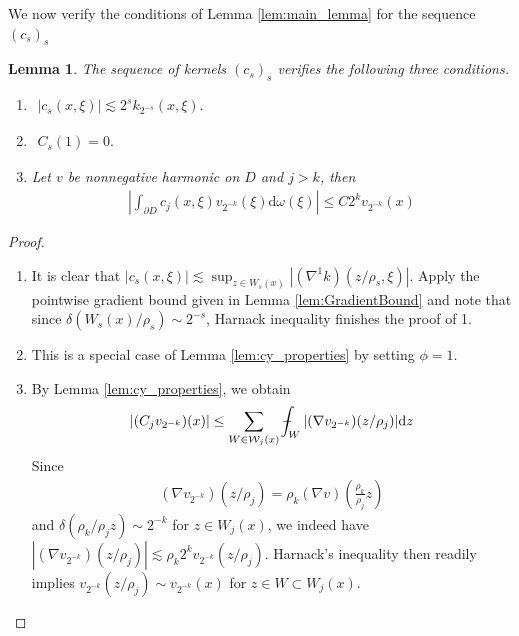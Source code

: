 \documentclass[a4paper,12pt]{article}
\newtheorem{lemma}[theorem]{Lemma}
\theoremstyle{definition}
\theoremstyle{definition}
\def\Xint#1{\mathchoice
	{\XXint\displaystyle\textstyle{#1}}%
	{\XXint\textstyle\scriptstyle{#1}}%
	{\XXint\scriptstyle\scriptscriptstyle{#1}}%
	{\XXint\scriptscriptstyle\scriptscriptstyle{#1}}%
	\!\int}
\def\XXint#1#2#3{{\setbox0=\hbox{$#1{#2#3}{\int}$ }
		\vcenter{\hbox{$#2#3$ }}\kern-.568\wd0}}
\def\dashint{\Xint-}
\begin{document}
	 We now verify the conditions of Lemma \ref{lem:main_lemma} for the sequence $(c_s)_s$
	 \begin{lemma}The sequence of kernels $(c_s)_s$ verifies the following three conditions.
	 	\begin{enumerate}
	 		\item$\begin{aligned}
	 			|c_s(x,\xi)|\lesssim 2^sk_{2^{-s}}(x,\xi).
	 		\end{aligned}$
	 		\item$\begin{aligned}
	 			C_s(1)=0.
	 		\end{aligned}$
	 		\item Let $v$ be nonnegative harmonic on $D$ and $j>k$, then
	 		\begin{align*}
	 			\left|\int_{\partial D}c_j(x,\xi)v_{2^{-k}}(\xi)\mathrm d\omega(\xi)\right| \leq C2^kv_{2^{-k}}(x)
	 		\end{align*}
	 	\end{enumerate}
	 \end{lemma}
	\begin{proof}
	 	\begin{enumerate}
	 		\item It is clear that $|c_s(x,\xi)|\lesssim\sup_{z\in W_s(x)}|(\nabla^1 k)(z/\rho_s,\xi)|$. Apply the pointwise gradient bound given in Lemma \ref{lem:GradientBound} and note that since $\delta(W_s(x)/\rho_s)\sim2^{-s}$, Harnack inequality finishes the proof of 1.
	 		\item This is a special case of Lemma \ref{lem:cy_properties} by setting $\phi=1$.
	 		\item By Lemma \ref{lem:cy_properties}, we obtain
	 		\begin{align*}
	 			\left|(C_jv_{2^{-k}})(x)\right|\leq\sum_{ W\in \mathcal W_j(x)}\dashint_{W}|(\nabla v_{2^{-k}})(z/\rho_j)|\mathrm dz
	 		\end{align*}
	 		Since 
	 		\begin{align*}
	 			(\nabla v_{2^{-k}})(z/\rho_j)=\rho_k(\nabla v)\left(\frac{\rho_k}{\rho_j} z\right)
	 		\end{align*}
	 		and $\delta(\rho_k/\rho_j z)\sim2^{-k}$ for $z\in W_j(x)$, we indeed have $|(\nabla v_{2^{-k}})(z/\rho_j)|\lesssim \rho_k2^k v_{2^{-k}}(z/\rho_j)$. Harnack's inequality then readily implies $v_{2^{-k}}(z/\rho_j)\sim v_{2^{-k}}(x)$ for  $z\in W\subset W_j(x)$.
	 	\end{enumerate}
	\end{proof}
	
\end{document}
